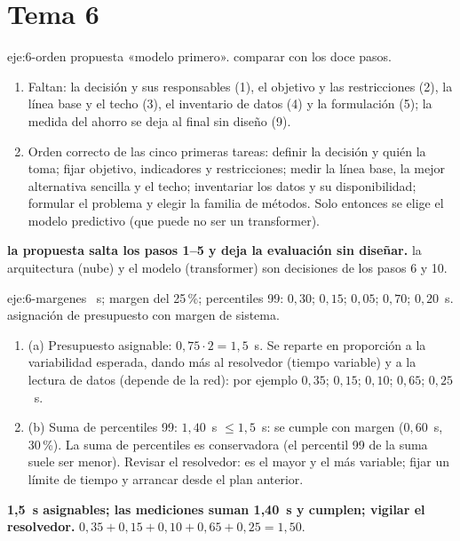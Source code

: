 \section{Tema 6}

\begin{solucion}{eje:6-orden}
\datos propuesta «modelo primero».
\planteamiento comparar con los doce pasos.
\pasos
\begin{enumerate}[label=\arabic*.]
  \item Faltan: la decisión y sus responsables (1), el objetivo y las restricciones (2), la línea base y el techo (3), el inventario de datos (4) y la formulación (5); la medida del ahorro se deja al final sin diseño (9).
  \item Orden correcto de las cinco primeras tareas: definir la decisión y quién la toma; fijar objetivo, indicadores y restricciones; medir la línea base, la mejor alternativa sencilla y el techo; inventariar los datos y su disponibilidad; formular el problema y elegir la familia de métodos. Solo entonces se elige el modelo predictivo (que puede no ser un transformer).
\end{enumerate}
\resultado \textbf{la propuesta salta los pasos 1--5 y deja la evaluación sin diseñar.}
\comprobacion la arquitectura (nube) y el modelo (transformer) son decisiones de los pasos 6 y 10.
\end{solucion}

\begin{solucion}{eje:6-margenes}
~s; margen del 25\,\%; percentiles 99: $0{,}30$; $0{,}15$; $0{,}05$; $0{,}70$; $0{,}20$~s.
\planteamiento asignación de presupuesto con margen de sistema.
\pasos
\begin{enumerate}[label=\arabic*.]
  \item (a) Presupuesto asignable: $0{,}75\cdot2=1{,}5$~s. Se reparte en proporción a la variabilidad esperada, dando más al resolvedor (tiempo variable) y a la lectura de datos (depende de la red): por ejemplo $0{,}35$; $0{,}15$; $0{,}10$; $0{,}65$; $0{,}25$~s.
  \item (b) Suma de percentiles 99: $1{,}40$~s $\le1{,}5$~s: se cumple con margen ($0{,}60$~s, 30\,\%). La suma de percentiles es conservadora (el percentil 99 de la suma suele ser menor). Revisar el resolvedor: es el mayor y el más variable; fijar un límite de tiempo y arrancar desde el plan anterior.
\end{enumerate}
\resultado \textbf{1{,}5~s asignables; las mediciones suman 1{,}40~s y cumplen; vigilar el resolvedor.}
\comprobacion $0{,}35+0{,}15+0{,}10+0{,}65+0{,}25=1{,}50$.
\end{solucion}

